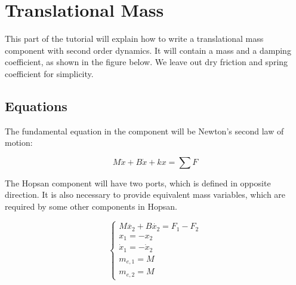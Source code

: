 \documentclass[a4paper,pdftex]{article}
\begin{document}
\section*{Translational Mass}
This part of the tutorial will explain how to write a translational mass component with second order dynamics. It will contain a mass and a damping coefficient, as shown in the figure below. We leave out dry friction and spring coefficient for simplicity.


\subsection*{Equations}

The fundamental equation in the component will be Newton's second law of motion:

\begin{equation*}
M\ddot{x} + B\dot{x} + k x = \sum{F}
\end{equation*}

The Hopsan component will have two ports, which is defined in opposite direction. It is also necessary to provide equivalent mass variables, which are required by some other components in Hopsan. 

\begin{equation*}
\begin{cases}
M\ddot{x_{2}} + B\dot{x_{2}} = F_{1} - F_{2}\\
x_{1} = -x_{2} \\
\dot{x}_{1} = -\dot{x}_{2} \\
m_{e,1} = M \\
m_{e,2} = M
\end{cases}
\end{equation*}
\end{document}
